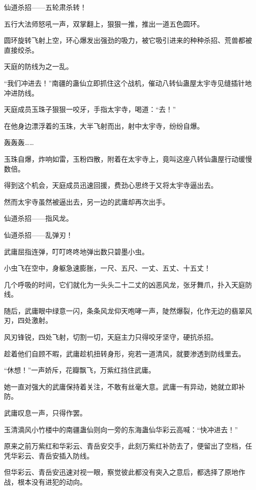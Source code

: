 
\begin{this_body}

仙道杀招——五轮肃杀转！

五行大法师怒吼一声，双掌翻上，狠狠一推，推出一道五色圆环。

圆环旋转飞射上空，环心爆发出强劲的吸力，被它吸引进来的种种杀招、荒兽都被直接绞杀。

天庭的防线为之一乱。

“我们冲进去！”南疆的蛊仙立即抓住这个战机，催动八转仙蛊屋太宇寺见缝插针地冲进防线。

天庭成员玉珠子狠狠一咬牙，手指太宇寺，喝道：“去！”

在他身边漂浮着的玉珠，大半飞射而出，射中太宇寺，纷纷自爆。

轰轰轰……

玉珠自爆，炸响如雷，玉粉四散，附着在太宇寺上，竟叫这座八转仙蛊屋行动缓慢数倍。

得到这个机会，天庭成员迅速回援，费劲心思终于又将太宇寺逼出去。

然而太宇寺虽然被逼出去，另一边的武庸却再次出手。

仙道杀招——指风龙。

仙道杀招——乱弹刃！

武庸屈指连弹，叮叮咚咚地弹出数只碧墨小虫。

小虫飞在空中，身躯急速膨胀，一尺、五尺、一丈、五丈、十五丈！

几个呼吸的时间，它们就化为一头头二十二丈的凶恶风龙，张牙舞爪，扑入天庭防线。

随后，武庸眼中绿意一闪，条条风龙仰天咆哮一声，陡然爆裂，化作无边的翡翠风刃，四处激射。

风刃锋锐，四处飞射，切割一切，天庭主力只得咬牙坚守，硬抗杀招。

趁着他们自顾不暇，武庸趁机扭转身形，宛若一道清风，就要渗透到防线里去。

“休想！”一声娇斥，花瓣飘飞，万紫红挡住武庸。

她一直对强大的武庸保持着关注，不敢有丝毫大意。武庸一有异动，她就立即补防。

武庸叹息一声，只得作罢。

玉清滴风小竹楼中的南疆蛊仙则向一旁的东海蛊仙华彩云高喊：“快冲进去！”

原来之前万紫红和华彩云、青岳安交手，此刻万紫红补防去了，便留出了空档，任凭华彩云、青岳安插入防线。

但华彩云、青岳安迅速对视一眼，察觉彼此都没有突入之意后，都选择了原地作战，根本没有进犯的动向。


\end{this_body}

